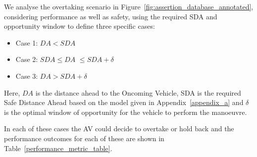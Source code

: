 %
%




We analyse the overtaking scenario in Figure~\ref{fig:assertion_database_annotated}, considering performance as well as safety, using the required SDA and opportunity window to define three specific cases:
\begin{itemize}

    \item Case 1: $DA < SDA$
    \item Case 2: $SDA \leq DA$ $\leq SDA + \delta$
    \item Case 3: $DA > SDA + \delta$
\end{itemize}

Here, $DA$ is the distance ahead to the Oncoming Vehicle,
SDA is the required Safe Distance Ahead based on the model given in Appendix~\ref{appendix_a} and $\delta$ is the optimal window of opportunity for the vehicle to perform the manoeuvre. 

%
In each of these cases the AV could decide to overtake or hold back and the performance outcomes for each of these are shown in Table~\ref{performance_metric_table}. 

